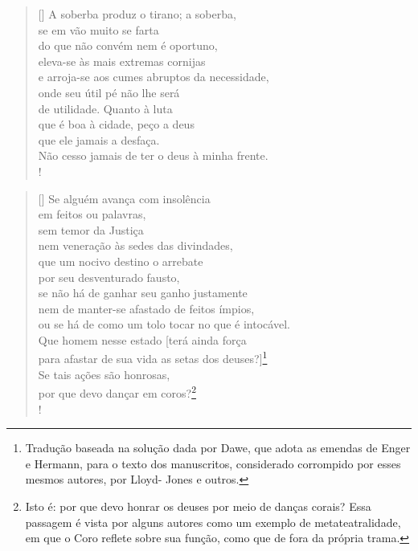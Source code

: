 
\begin{verse}[\versewidth]
A soberba produz o tirano; a soberba,\\ 
se em vão muito se farta\\
do que não convém nem é oportuno,\\
eleva-se às mais extremas cornijas\\
e arroja-se aos cumes abruptos da necessidade,\\
onde seu útil pé não lhe será\\
de utilidade. Quanto à luta\\
que é boa à cidade, peço a deus\\
que ele jamais a desfaça.\\
Não cesso jamais de ter o deus à minha frente.\\!
\end{verse} 

\settowidth{\versewidth}{brilhante? Tenso, agito-me com medo em meu trêm}
\begin{verse}[\versewidth] 
Se alguém avança com insolência\\ 
em feitos ou palavras,\\
sem temor da Justiça\\
nem veneração às sedes das divindades,\\
que um nocivo destino o arrebate\\
por seu desventurado fausto,\\
se não há de ganhar seu ganho justamente\\
nem de manter-se afastado de feitos ímpios,\\
ou se há de como um tolo tocar no que é intocável.\\
Que homem nesse estado {[}terá ainda força\\
para afastar de sua vida as setas dos deuses?{]}\footnote{Tradução
baseada na solução dada por Dawe, que adota as emendas de Enger e
Hermann, para o texto dos manuscritos, considerado corrompido por
esses mesmos autores, por Lloyd- Jones e outros.}\\
Se tais ações são honrosas,\\
por que devo dançar em coros?\footnote{Isto é: por que devo honrar os
  deuses por meio de danças corais? Essa passagem é vista por alguns
  autores como um exemplo de metateatralidade, em que o Coro reflete
  sobre sua função, como que de fora da própria trama.}\\!
\end{verse} 

